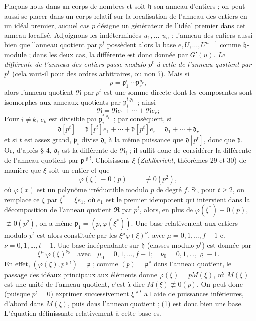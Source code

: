 Plaçons-nous dans un corps de nombres et soit $\mathfrak h$ son anneau d'entiers ; on peut aussi se placer dans un corps relatif sur la localisation de l'anneau des entiers en un idéal premier, auquel cas $p$ désigne un générateur de l'idéal premier dans cet anneau localisé. Adjoignons les indéterminées $u_1,\ldots,u_n$ ; l'anneau des entiers aussi bien que l'anneau quotient par $p^t$ possèdent alors la base $e,U,\ldots,U^{n-1}$ comme $\mathfrak h$-module ; dans les deux cas, la différente est donc donnée par $G'(u)$. \emph{La différente de l'anneau des entiers passe modulo $p^t$ à celle de l'anneau quotient par $p^t$} (cela vaut-il pour des ordres arbitraires, ou non ?). Mais si
\[
p=\mathfrak p_1^{\varrho_1}\cdots\mathfrak p_r^{\varrho_r},
\]
alors l'anneau quotient $\mathfrak R$ par $p^t$ est une somme directe dont les composantes sont isomorphes aux anneaux quotients par $\mathfrak p_i^{t\varrho_i}$ ; ainsi
\[
\mathfrak R=\mathfrak R e_1+\cdots+\mathfrak R e_r;
\]
Pour $i\ne k$, $e_k$ est divisible par $\mathfrak p_i^{t\varrho_i}$ ; par conséquent, si
\[
\mathfrak d[p^t]=\mathfrak d[p^t]e_1+\cdots+\mathfrak d[p^t]e_r
=\mathfrak d_1+\cdots+\mathfrak d_r
\]
et si $t$ est assez grand, $\mathfrak p_i$ divise $\mathfrak d_i$ à la même puissance que $\mathfrak d[p^t]$, donc que $\mathfrak d$. Or, d'après \S{} 4, $\mathfrak d_i$ est la différente de $\mathfrak R_i$ ; il suffit donc de considérer la différente de l'anneau quotient par $\mathfrak p^{\varrho t}$. Choisissons $\xi$ (\emph{Zahlbericht}, théorèmes 29 et 30) de manière que $\xi$ soit un entier et que
\[
\varphi(\xi)\equiv0(p),
\qquad \not\equiv0(p^2),
\]
où $\varphi(x)$ est un polynôme irréductible modulo $p$ de degré $f$. Si, pour $t\ge2$, on remplace ce $\xi$ par $\xi^*=\xi e_1$, où $e_1$ est le premier idempotent qui intervient dans la décomposition de l'anneau quotient $\mathfrak R$ par $p^t$, alors, en plus de $\varphi(\xi^*)\equiv0(p)$, $\not\equiv0(p^2)$, on a même $\mathfrak p_1=(p,\varphi(\xi^*))$. Une base relativement aux entiers modulo $p^t$ est alors constituée par les $\xi^\mu\varphi(\xi)^\nu$, avec $\mu=0,1,\ldots,f-1$ et $\nu=0,1,\ldots,t-1$. Une base indépendante sur $\mathfrak h$ (classes modulo $p^t$) est donnée par
\begin{equation}
\xi^{\mu_0}\varphi(\xi)^{\nu_0}
\quad\text{avec}\quad
\mu_0=0,1,\ldots,f-1;
\quad \nu_0=0,1,\ldots,\varrho-1. \tag{1}
\end{equation}
En effet, $(\varphi(\xi),p^{\varrho t})=\mathfrak p$ ; comme $(p)=\mathfrak p^\varrho$ dans l'anneau quotient, le passage des idéaux principaux aux éléments donne $\varphi(\xi)=pM(\xi)$, où $M(\xi)$ est une unité de l'anneau quotient, c'est-à-dire $M(\xi)\not\equiv0(p)$. On peut donc (puisque $p^t=0$) exprimer successivement $\xi^{\varrho t}$ à l'aide de puissances inférieures, d'abord dans $M(\xi)$, puis dans l'anneau quotient ; (1) est donc bien une base. L'équation définissante relativement à cette base est
